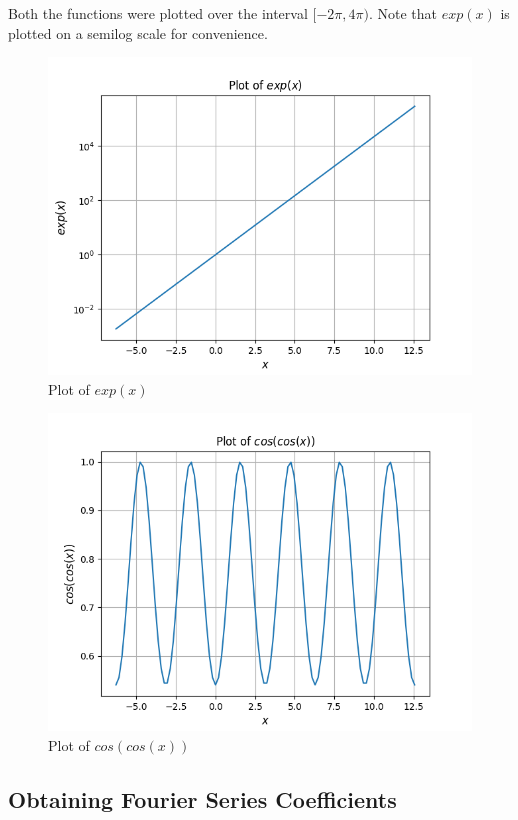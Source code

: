 \documentclass{article}
\begin{document}
Both the functions were plotted over the interval $[-2\pi,4\pi)$. Note that $exp(x)$ is plotted on a semilog scale for convenience.

\begin{figure}[h]
    \centering
    \includegraphics[scale = 0.4]{Figure_1.png}
    \caption{Plot of $exp(x)$}
    \label{fig:my_label}
\end{figure}

\begin{figure}[h]
    \centering
    \includegraphics[scale = 0.4]{Figure_2.png}
    \caption{Plot of $cos(cos(x))$}
    \label{fig:my_label}
\end{figure}
\newpage
\subsection{Obtaining Fourier Series Coefficients}
\end{document}
